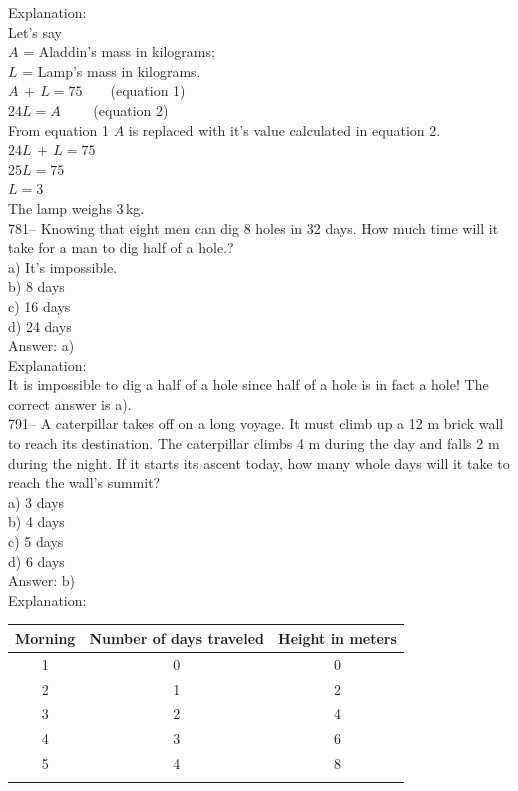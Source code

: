 \documentclass[letterpaper, 12pt]{article}
\begin{document}
Explanation:\\
Let's say\\
$A$ = Aladdin's mass in kilograms; \\
$L$ = Lamp's mass in kilograms.\\

$A\,+\,L=75 \qquad $(equation 1)\\
$24L=A \qquad $ (equation 2)\\

From equation 1 $A$ is replaced with it's value calculated in equation 2.\\
$24L \,+\,L = 75$\\
$25L=75$\\
$L=3$\\
The lamp weighs 3\,kg.\\

781-- Knowing that eight men can dig 8 holes in 32 days. How much time will it take for a man to dig half of a hole.?\\

a) It's impossible.\\
b) 8 days\\
c) 16 days\\
d) 24 days\\

Answer: a)\\

Explanation: \\
It is impossible to dig a half of a hole since half of a hole is in fact a hole! The correct answer is a).\\

791-- A caterpillar takes off on a long voyage. It must climb up a 12 m brick wall to reach its destination. The caterpillar climbs 4 m during the day and falls 2 m during the night.  If it starts its ascent today, how many whole days will it take to reach the wall's summit?\\

a) 3 days\\
b) 4 days\\
c) 5 days\\
d) 6 days\\

Answer: b)\\

Explanation: \\

\begin{tabular}{|c|c|c|} \hline
{\bf Morning} & {\bf Number of days traveled} & {\bf Height in meters} \\
\hline \hline

1 & 0 & 0 \\ \hline
2 & 1 & 2\\ \hline
3 & 2 & 4\\ \hline
4 & 3 & 6\\ \hline
5 & 4 & 8\\ \hline
\multicolumn{3}{c}{}\\

\end{tabular}\\
\end{document}
